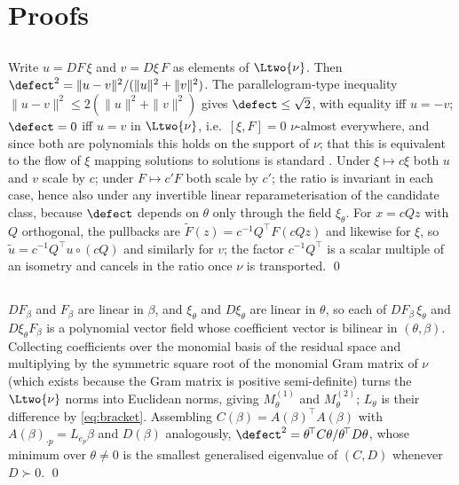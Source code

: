 \section{Proofs}
\label{app:proofs}

\subsection*{}
Write $u = DF\,\xi$ and $v = D\xi\,F$ as elements of $\Ltwo{\nu}$. Then
$\defect^2 = \|u-v\|^2/(\|u\|^2+\|v\|^2)$. The parallelogram-type inequality
$\|u-v\|^2 \le 2(\|u\|^2+\|v\|^2)$ gives $\defect \le \sqrt 2$, with equality
iff $u = -v$; $\defect = 0$ iff $u = v$ in $\Ltwo{\nu}$, i.e.\ $[\xi,F]=0$
$\nu$-almost everywhere, and since both are polynomials this holds on the
support of $\nu$; that this is equivalent to the flow of $\xi$ mapping solutions
to solutions is standard \citep[Ch.~9]{lee2013smooth}. Under
$\xi \mapsto c\xi$ both $u$ and $v$ scale by $c$; under
$F \mapsto c'F$ both scale by $c'$; the ratio is invariant in each case, hence
also under any invertible linear reparameterisation of the candidate class,
because $\defect$ depends on $\theta$ only through the field $\xi_\theta$.
For $x = cQz$ with $Q$ orthogonal, the pullbacks are
$\tilde F(z) = c^{-1}Q^{\!\top}F(cQz)$ and likewise for $\xi$, so
$\tilde u = c^{-1}Q^{\!\top}u \circ (cQ)$ and similarly for $v$; the factor
$c^{-1}Q^{\!\top}$ is a scalar multiple of an isometry and cancels in the
ratio once $\nu$ is transported. \qed

\subsection*{}
$DF_\beta$ and $F_\beta$ are linear in $\beta$, and $\xi_\theta$ and
$D\xi_\theta$ are linear in $\theta$, so each of $DF_\beta\,\xi_\theta$ and
$D\xi_\theta F_\beta$ is a polynomial vector field whose coefficient vector is
bilinear in $(\theta,\beta)$. Collecting coefficients over the monomial basis of
the residual space and multiplying by the symmetric square root of the monomial
Gram matrix of $\nu$ (which exists because the Gram matrix is positive
semi-definite) turns the $\Ltwo{\nu}$ norms into Euclidean norms, giving
$M^{(1)}_\theta$ and $M^{(2)}_\theta$; $L_\theta$ is their difference by
\eqref{eq:bracket}. Assembling $C(\beta) = A(\beta)^{\!\top}A(\beta)$ with
$A(\beta)_{\cdot p} = L_{e_p}\beta$ and $D(\beta)$ analogously,
$\defect^2 = \theta^{\!\top}C\theta / \theta^{\!\top}D\theta$, whose minimum
over $\theta \ne 0$ is the smallest generalised eigenvalue of $(C,D)$ whenever
$D \succ 0$. \qed

